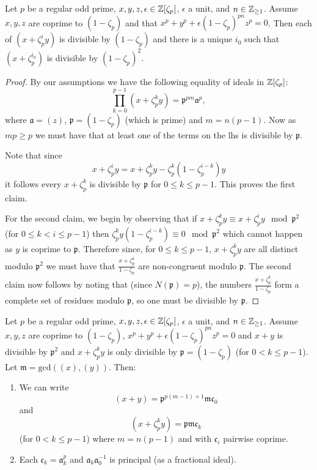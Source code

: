 \begin{lemma}\label{lem:gen_dvd_by_frak_p}
		Let $p$ be a regular odd prime, $x,y,z,\epsilon \in \mathbb{Z}[\zeta_p]$, $\epsilon$ a unit, and $n \in \mathbb{Z}_{\geq 1}$. Assume $x,y,z$ are coprime to $(1-\zeta_p)$ and that $x^p+y^p+\epsilon(1-\zeta_p)^{pn}z^p=0$. Then each of $(x+\zeta_p^i y)$ is divisible by $(1-\zeta_p)$ and there is a unique $i_0$ such that $(x+\zeta_p^{i_0})$ is divisible by $(1-\zeta_p)^2$.
\end{lemma}
\begin{proof}
	By our assumptions we have the following equality of ideals in  $\mathbb{Z}[\zeta_p]$: \[ \prod_{k=0}^{p-1} (x+\zeta_p^ky) = \mathfrak{p}^{pm}\mathfrak{a}^p,  \] where $\mathfrak{a}=(z)$, $\mathfrak{p}=(1-\zeta_p)$ (which is prime) and $m=n(p-1)$. Now as $mp \geq p$ we must have that at least one of the terms on the lhs is divisible by $\mathfrak{p}$.

	Note that since \[x+\zeta_p^iy= x+\zeta_p^ky - \zeta_p^k(1-\zeta_p^{i-k})y\] it follows every  $x+\zeta_p^k$ is divisible by $\mathfrak{p}$ for $0 \le k \le p-1$. This proves the first claim.

	For the second claim, we begin by observing that if $x+\zeta_p^ky \equiv x + \zeta_p^i y \mod \mathfrak{p}^2$ (for $0 \leq k < i \leq p-1$) then $\zeta_p^ky(1-\zeta_p^{i-k}) \equiv 0 \mod \mathfrak{p}^2$ which cannot happen as $y$ is coprime to $\mathfrak{p}$. Therefore since, for $0 \leq k \leq p-1$, $x+\zeta_p^ky$ are all distinct modulo $\mathfrak{p}^2$ we must have that $\frac{x+\zeta_p^k}{1-\zeta_p}$ are non-congruent modulo $\mathfrak{p}$. The second claim now follows by noting that (since $N(\mathfrak{p})=p$), the numbers $\frac{x+\zeta_p^k}{1-\zeta_p}$ form a complete set of residues modulo $\mathfrak{p}$, so one must be divisible by $\mathfrak{p}$.
\end{proof}

\begin{lemma}\label{lem:gen_ideal_coprimality}
		Let $p$ be a regular odd prime, $x,y,z,\epsilon \in \mathbb{Z}[\zeta_p]$, $\epsilon$ a unit, and $n \in \mathbb{Z}_{\geq 1}$. Assume $x,y,z$ are coprime to $(1-\zeta_p)$,  $x^p+y^p+\epsilon(1-\zeta_p)^{pn}z^p=0$ and $x+y$ is divisible by $\mathfrak{p}^2$ and $x+ \zeta_p^ky$ is only divisible by $\mathfrak{p}=(1-\zeta_p)$ (for $0 < k \leq p-1$).
		Let $\mathfrak{m}= \mathrm{gcd}((x),(y))$. Then:
		\begin{enumerate}
			\item We can write 	\[(x+y)=\mathfrak{p}^{p(m-1)+1}\mathfrak{m}\mathfrak{c}_0\] and \[ (x+\zeta_p^k y)=\mathfrak{p}\mathfrak{m}\mathfrak{c}_k \] (for $0 < k \leq p-1$) where $m=n(p-1)$ and with $\mathfrak{c}_i$ pairwise coprime.
			\item Each $\mathfrak{c}_k=\mathfrak{a}_k^p$ and $\mathfrak{a}_k\mathfrak{a}_0^{-1}$ is principal (as a fractional ideal).
		\end{enumerate}

\end{lemma}


